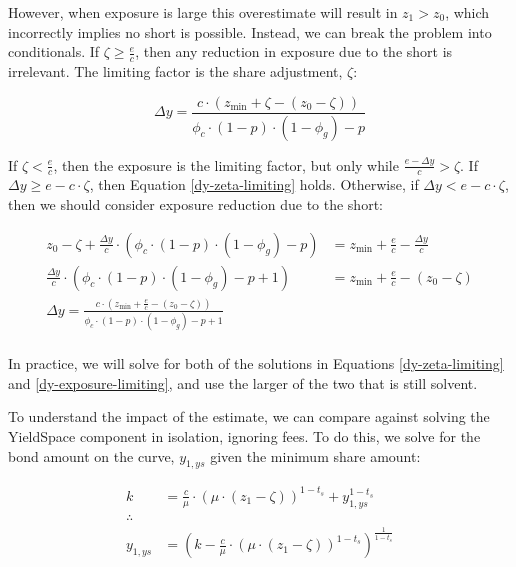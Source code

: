 However, when exposure is large this overestimate will result in $z_1 > z_0$, which incorrectly implies no short is possible.
Instead, we can break the problem into conditionals.
If $\zeta \ge \tfrac{e}{c}$, then any reduction in exposure due to the short is irrelevant.
The limiting factor is the share adjustment, $\zeta$:

\begin{equation}\label{dy-zeta-limiting}
    \Delta y = \frac{c \cdot \left( z_{\text{min}} + \zeta  - \left( z_0 - \zeta \right) \right)}{\phi_c \cdot (1 - p) \cdot (1 - \phi_g) - p}
\end{equation}

If $\zeta < \tfrac{e}{c}$, then the exposure is the limiting factor, but only while $\tfrac{e - \Delta y}{c} > \zeta$.
If $\Delta y \ge e - c \cdot \zeta$, then Equation \eqref{dy-zeta-limiting} holds.
Otherwise, if $\Delta y < e - c \cdot \zeta$, then we should consider exposure reduction due to the short:

\begin{equation}\label{dy-exposure-limiting}
\begin{aligned}
    z_0 - \zeta + \tfrac{\Delta y}{c} \cdot \left( \phi_c \cdot (1 - p) \cdot (1 - \phi_g) - p \right) &= z_{\text{min}} + \tfrac{e}{c} - \tfrac{\Delta y}{c}  \\
    \tfrac{\Delta y}{c} \cdot \left( \phi_c \cdot (1 - p) \cdot (1 - \phi_g) - p + 1 \right) &= z_{\text{min}} + \tfrac{e}{c} - \left( z_0 - \zeta \right) \\
    \Delta y = \frac{c \cdot \left( z_{\text{min}} + \tfrac{e}{c} - \left( z_0 - \zeta \right) \right)}{\phi_c \cdot (1 - p) \cdot (1 - \phi_g) - p + 1} \\
\end{aligned}
\end{equation}

In practice, we will solve for both of the solutions in Equations \eqref{dy-zeta-limiting} and \eqref{dy-exposure-limiting}, and use the larger of the two that is still solvent.



To understand the impact of the estimate, we can compare against solving the YieldSpace component in isolation, ignoring fees.
To do this, we solve for the bond amount on the curve, $y_{1,ys}$ given the minimum share amount:

\begin{equation}\label{linear-ys-y1}
\begin{aligned}
    k &= \tfrac{c}{\mu} \cdot \left( \mu \cdot \left( z_{1} - \zeta \right) \right)^{1 - t_s} + y_{1,ys}^{1 - t_s} \\
    \therefore \\
    y_{1,ys} &= \left( k - \tfrac{c}{\mu} \cdot \left( \mu \cdot \left( z_{1} - \zeta \right) \right)^{1 - t_s} \right)^{\tfrac{1}{1 - t_s}}
\end{aligned}
\end{equation}

